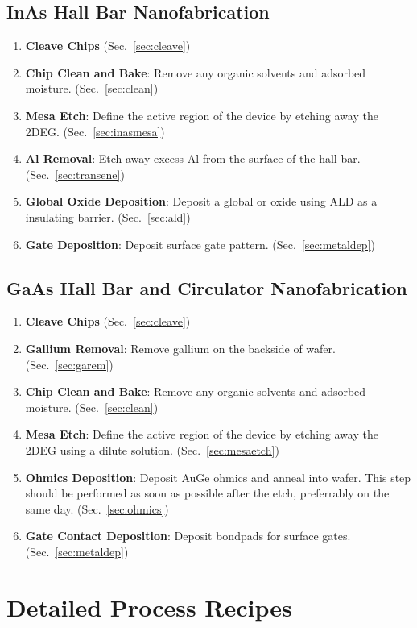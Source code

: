 \subsection{InAs Hall Bar Nanofabrication}
\begin{enumerate}
    \item \textbf{Cleave Chips} (Sec.~\ref{sec:cleave})
    \item \textbf{Chip Clean and Bake}: Remove any organic solvents and adsorbed moisture. (Sec.~\ref{sec:clean})
    \item \textbf{Mesa Etch}: Define the active region of the device by etching away the 2DEG. (Sec.~\ref{sec:inasmesa})
    \item \textbf{Al Removal}: Etch away excess Al from the surface of the hall bar. (Sec.~\ref{sec:transene})
    \item \textbf{Global Oxide Deposition}: Deposit a global  or  oxide using ALD as a insulating barrier. (Sec.~\ref{sec:ald})
    \item \textbf{Gate Deposition}: Deposit surface gate pattern. (Sec.~\ref{sec:metaldep})
\end{enumerate}

\subsection{GaAs Hall Bar and Circulator Nanofabrication}
\begin{enumerate}
    \item \textbf{Cleave Chips} (Sec.~\ref{sec:cleave})
    \item \textbf{Gallium Removal}: Remove gallium on the backside of wafer. (Sec.~\ref{sec:garem})
    \item \textbf{Chip Clean and Bake}: Remove any organic solvents and adsorbed moisture. (Sec.~\ref{sec:clean})
    \item \textbf{Mesa Etch}: Define the active region of the device by etching away the 2DEG using a dilute  solution. (Sec.~\ref{sec:mesaetch})
    \item \textbf{Ohmics Deposition}: Deposit AuGe ohmics and anneal into wafer. This step should be performed as soon as possible after the etch, preferrably on the same day. (Sec.~\ref{sec:ohmics})
    \item \textbf{Gate Contact Deposition}: Deposit bondpads for surface gates. (Sec.~\ref{sec:metaldep})
\end{enumerate}

\section{Detailed Process Recipes}
